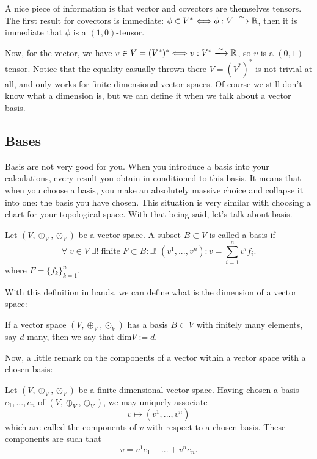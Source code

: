 A nice piece of information is that vector and covectors are themselves tensors. The first result for covectors is immediate: $\phi \in V^* \Longleftrightarrow \phi : V \xlongrightarrow[]{\sim} \mathbb{R}$, then it is immediate that $\phi$ is a $(1,0)$-tensor.

Now, for the vector, we have $v \in V = (V^*)^* \Longleftrightarrow v : V^* \xlongrightarrow[]{\sim} \mathbb{R}$, so $v$ is a $(0,1)$-tensor. Notice that the equality casually thrown there $V = (V^*)^*$ is not trivial at all, and only works for finite dimensional vector spaces. Of course we still don't know what a dimension is, but we can define it when we talk about a vector basis.

\subsection{Bases}
Basis are not very good for you. When you introduce a basis into your calculations, every result you obtain in conditioned to this basis. It means that when you choose a basis, you make an absolutely massive choice and collapse it into one: the basis you have chosen. This situation is very similar with choosing a chart for your topological space. With that being said, let's talk about basis.

\begin{definition}
    Let $(V, \oplus_V, \odot_V)$ be a vector space. A subset $B \subset V$ is called a basis if
    \[
        \forall \; v \in V \; \exists ! \; \text{finite} \; F \subset B: \exists ! \; (v^1,..., v^n) : v = \sum_{i=1}^n v^i f_i.
    \]
    where $F = \{f_k\}_{k=1}^n$.
\end{definition}

With this definition in hands, we can define what is the dimension of a vector space:

\begin{definition}
    If a vector space $(V, \oplus_V, \odot_V)$ has a basis $B \subset V$ with finitely many elements, say $d$ many, then we say that $\text{dim} V := d$.
\end{definition}

Now, a little remark on the components of a vector within a vector space with a chosen basis:

\begin{remark}
    Let $(V, \oplus_V, \odot_V)$ be a finite dimensional vector space. Having chosen a basis $e_1, ..., e_n$ of $(V, \oplus_V, \odot_V)$, we may uniquely associate 
    \[
        v \longmapsto (v^1, ..., v^n)
    \]
    which are called the components of $v$ with respect to a chosen basis. These components are such that
    \[
        v = v^1 e_1 +...+v^n e_n.
    \]
\end{remark}

